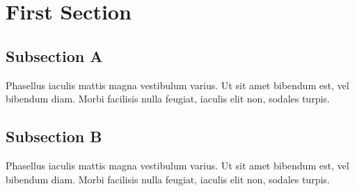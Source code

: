 \par\section{First Section}
\par\subsection{Subsection A}
\par\noindent Phasellus iaculis mattis magna vestibulum varius. Ut sit amet bibendum est, vel bibendum diam. Morbi facilisis nulla feugiat, iaculis elit non, sodales turpis.
\par\subsection{Subsection B}
\par\noindent Phasellus iaculis mattis magna vestibulum varius. Ut sit amet bibendum est, vel bibendum diam. Morbi facilisis nulla feugiat, iaculis elit non, sodales turpis.